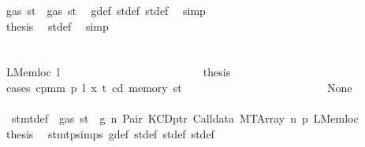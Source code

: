 \begin{isabellebody}
\ {\isachardoublequoteopen}gas\ st{\isacharprime}{\kern0pt}{\isacharprime}{\kern0pt}\ {\isasymle}\ gas\ st{\isacharprime}{\kern0pt}{\isachardoublequoteclose}\ \isamarkupfalse%
\ g{\isacharunderscore}{\kern0pt}def\ st{\isacharprime}{\kern0pt}{\isacharunderscore}{\kern0pt}def\ st{\isacharprime}{\kern0pt}{\isacharprime}{\kern0pt}{\isacharunderscore}{\kern0pt}def\ \isamarkupfalse%
\ simp\isanewline
\ \ \ \ \ \ \ \ \ \ \ \ \ \ \ \ \ \ \ \ \ \ \ \ \ \ \ \ \ \ \isamarkupfalse%
\ \isamarkupfalse%
\ {\isacharquery}{\kern0pt}thesis\ \isamarkupfalse%
\ st{\isacharprime}{\kern0pt}{\isacharunderscore}{\kern0pt}def\ \isamarkupfalse%
\ simp\isanewline
\ \ \ \ \ \ \ \ \ \ \ \ \ \ \ \ \ \ \ \ \ \ \ \ \ \ \ \ \isamarkupfalse%
\isanewline
\ \ \ \ \ \ \ \ \ \ \ \ \ \ \ \ \ \ \ \ \ \ \ \ \ \ \isamarkupfalse%
\isanewline
\ \ \ \ \ \ \ \ \ \ \ \ \ \ \ \ \ \ \ \ \ \ \ \ \isamarkupfalse%
\isanewline
\ \ \ \ \ \ \ \ \ \ \ \ \ \ \ \ \ \ \ \ \ \ \isamarkupfalse%
\isanewline
\ \ \ \ \ \ \ \ \ \ \ \ \ \ \ \ \ \ \ \ \isamarkupfalse%
\isanewline
\ \ \ \ \ \ \ \ \ \ \ \ \ \ \ \ \ \ \ \ \ \ \isamarkupfalse%
\ {\isacharparenleft}{\kern0pt}LMemloc\ l{\isacharparenright}{\kern0pt}\isanewline
\ \ \ \ \ \ \ \ \ \ \ \ \ \ \ \ \ \ \ \ \ \ \isamarkupfalse%
\ \isamarkupfalse%
\ {\isacharquery}{\kern0pt}thesis\isanewline
\ \ \ \ \ \ \ \ \ \ \ \ \ \ \ \ \ \ \ \ \ \ \isamarkupfalse%
\ {\isacharparenleft}{\kern0pt}cases\ {\isachardoublequoteopen}cpm{}m\ p\ l\ x\ t\ cd\ {\isacharparenleft}{\kern0pt}memory\ st{\isacharprime}{\kern0pt}{\isacharprime}{\kern0pt}{\isacharprime}{\kern0pt}{\isacharparenright}{\kern0pt}{\isachardoublequoteclose}{\isacharparenright}{\kern0pt}\isanewline
\ \ \ \ \ \ \ \ \ \ \ \ \ \ \ \ \ \ \ \ \ \ \ \ \isamarkupfalse%
\ None\isanewline
\ \ \ \ \ \ \ \ \ \ \ \ \ \ \ \ \ \ \ \ \ \ \ \ \isamarkupfalse%
\ {}{\isacharparenleft}{\kern0pt}{}{\isacharparenright}{\kern0pt}\ stmt{\isacharunderscore}{\kern0pt}def\ {\isacharbackquoteopen}{\isasymnot}\ gas\ st\ {\isasymle}\ g{\isacharbackquoteclose}\ n\ Pair\ KCDptr\ Calldata\ MTArray\ n{}\ p{}\ LMemloc\ \isamarkupfalse%
\ {\isacharquery}{\kern0pt}thesis\ \isamarkupfalse%
\ stmt{\isachardot}{\kern0pt}psimps{\isacharparenleft}{\kern0pt}{}{\isacharparenright}{\kern0pt}\ g{\isacharunderscore}{\kern0pt}def\ st{\isacharprime}{\kern0pt}{\isacharunderscore}{\kern0pt}def\ st{\isacharprime}{\kern0pt}{\isacharprime}{\kern0pt}{\isacharunderscore}{\kern0pt}def\ st{\isacharprime}{\kern0pt}{\isacharprime}{\kern0pt}{\isacharprime}{\kern0pt}{\isacharunderscore}{\kern0pt}def\ \isamarkupfalse%

\end{isabellebody}
